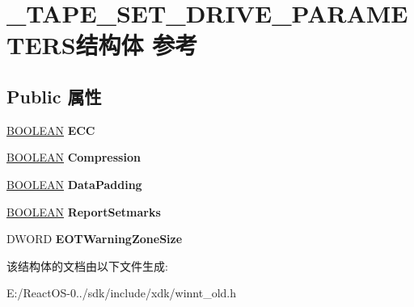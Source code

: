 \hypertarget{struct___t_a_p_e___s_e_t___d_r_i_v_e___p_a_r_a_m_e_t_e_r_s}{}\section{\+\_\+\+T\+A\+P\+E\+\_\+\+S\+E\+T\+\_\+\+D\+R\+I\+V\+E\+\_\+\+P\+A\+R\+A\+M\+E\+T\+E\+R\+S结构体 参考}
\label{struct___t_a_p_e___s_e_t___d_r_i_v_e___p_a_r_a_m_e_t_e_r_s}
\subsection*{Public 属性}
\begin{DoxyCompactItemize}
\item 
\mbox{\label{struct___t_a_p_e___s_e_t___d_r_i_v_e___p_a_r_a_m_e_t_e_r_s_af8f480c3895320f434197819f483cfaf}} 
\hyperlink{_processor_bind_8h_a112e3146cb38b6ee95e64d85842e380a}{B\+O\+O\+L\+E\+AN} {\bfseries E\+CC}
\item 
\mbox{\label{struct___t_a_p_e___s_e_t___d_r_i_v_e___p_a_r_a_m_e_t_e_r_s_abb2419b10743ed8017ef32a33ac9bfa6}} 
\hyperlink{_processor_bind_8h_a112e3146cb38b6ee95e64d85842e380a}{B\+O\+O\+L\+E\+AN} {\bfseries Compression}
\item 
\mbox{\label{struct___t_a_p_e___s_e_t___d_r_i_v_e___p_a_r_a_m_e_t_e_r_s_a28b1d9c29645f7004e5e10a8d7844ae5}} 
\hyperlink{_processor_bind_8h_a112e3146cb38b6ee95e64d85842e380a}{B\+O\+O\+L\+E\+AN} {\bfseries Data\+Padding}
\item 
\mbox{\label{struct___t_a_p_e___s_e_t___d_r_i_v_e___p_a_r_a_m_e_t_e_r_s_a56816d029bf299087d356b5973d14046}} 
\hyperlink{_processor_bind_8h_a112e3146cb38b6ee95e64d85842e380a}{B\+O\+O\+L\+E\+AN} {\bfseries Report\+Setmarks}
\item 
\mbox{\label{struct___t_a_p_e___s_e_t___d_r_i_v_e___p_a_r_a_m_e_t_e_r_s_a6599e7e86d8cbce0194f39eadf0841d2}} 
D\+W\+O\+RD {\bfseries E\+O\+T\+Warning\+Zone\+Size}
\end{DoxyCompactItemize}


该结构体的文档由以下文件生成\+:\begin{DoxyCompactItemize}
\item 
E\+:/\+React\+O\+S-\/0../sdk/include/xdk/winnt\+\_\+old.\+h\end{DoxyCompactItemize}

